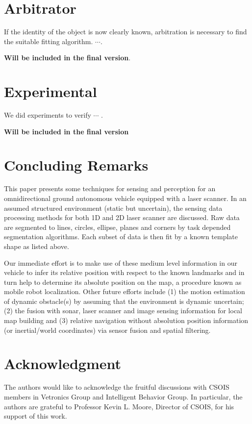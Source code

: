 \documentclass{cdcarta4}
\begin{document}
\section{Arbitrator}
If the identity of the object is now clearly known, arbitration is necessary to find the suitable fitting algorithm. $\cdots$.

{\bf Will be included in the final version}.

\section{Experimental}
We did experiments to verify $\cdots$ .

{\bf Will be included in the final version}

\section{{Concluding Remarks}}  
\label{sec6}
   
This paper presents some techniques for sensing and perception for an
omnidirectional ground autonomous vehicle equipped with a laser scanner. In an
assumed structured environment (static but uncertain), the sensing data processing methods for both 1D
and 2D laser scanner are discussed. Raw data are segmented to lines, circles,
ellipse, planes and corners by task depended segmentation algorithms.  Each
subset of data is then fit by a known template shape as listed above.  

Our immediate effort is to make use of these medium level information in our  vehicle to infer its relative position with respect to the known landmarks and in turn help to determine its absolute
position on the map, a procedure known as mobile robot localization.
Other future efforts include (1) the motion estimation of dynamic obstacle(s) by assuming that the environment is dynamic uncertain; (2) the fusion with sonar, laser scanner and image sensing information for local map building and
 (3)  relative navigation  without  absolution position information (or inertial/world coordinates) via sensor fusion and spatial filtering.





\section*{Acknowledgment}
The authors would like to acknowledge the fruitful discussions with 
CSOIS members in Vetronics Group and Intelligent Behavior Group. In particular, 
  the authors are grateful to Professor Kevin L. Moore,  Director of CSOIS, for his   support  of this work.
 

 
\end{document}
